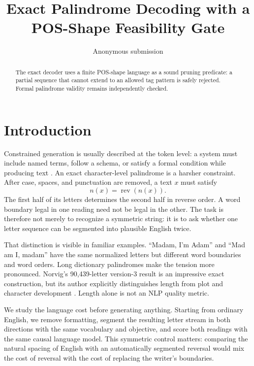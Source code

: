 \documentclass[11pt]{article}
\title{Exact Palindrome Decoding with a POS-Shape Feasibility Gate}
\author{Anonymous submission}
\newcommand{\norm}[1]{n(#1)}
\newcommand{\rev}{\operatorname{rev}}
\begin{document}
\maketitle

\begin{abstract}
The exact decoder uses a finite POS-shape language as a sound pruning predicate: a partial sequence that cannot extend to an allowed tag pattern is safely rejected. Formal palindrome validity remains independently checked.
\end{abstract}

\section{Introduction}

Constrained generation is usually described at the token level: a system must
include named terms, follow a schema, or satisfy a formal condition while
producing text \citep{hokamp2017grid,post2018fast,lu2022astar}. An exact
character-level palindrome is a harsher constraint. After case, spaces, and
punctuation are removed, a text $x$ must satisfy
\begin{equation}
  \norm{x}=\rev(\norm{x}).
\end{equation}
The first half of its letters determines the second half in reverse order. A
word boundary legal in one reading need not be legal in the other. The task is
therefore not merely to recognize a symmetric string: it is to ask whether one
letter sequence can be segmented into plausible English twice.

That distinction is visible in familiar examples. ``Madam, I'm Adam'' and
``Mad am I, madam'' have the same normalized letters but different word
boundaries and word orders. Long dictionary palindromes make the tension more
pronounced. Norvig's 90,439-letter version-3 result is an impressive exact
construction, but its author explicitly distinguishes length from plot and
character development \citep{norvig2016palindrome}. Length alone is not an
NLP quality metric.

We study the language cost before generating anything. Starting from ordinary
English, we remove formatting, segment the resulting letter stream in both
directions with the same vocabulary and objective, and score both readings
with the same causal language model. This symmetric control matters: comparing
the natural spacing of English with an automatically segmented reversal would
mix the cost of reversal with the cost of replacing the writer's boundaries.
\end{document}

